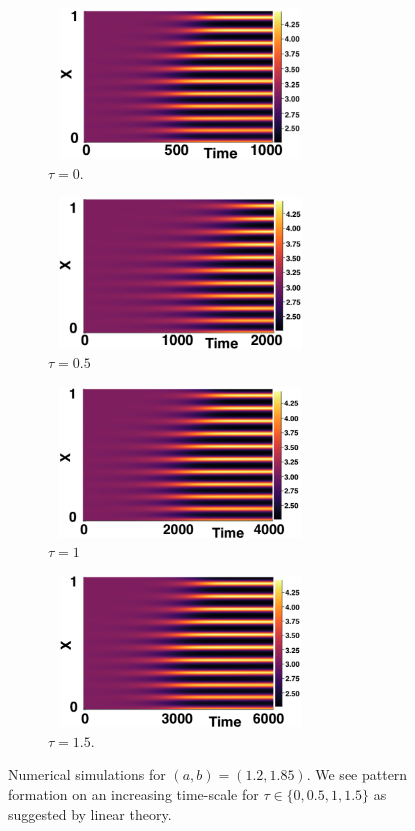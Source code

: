 \begin{figure}[H]
    \centering
    \begin{subfigure}[b]{0.45\textwidth}
        \centering
        \includegraphics[width=7cm,height=4cm]{p2t0.png}
        \caption{$\tau=0$.}
        \label{}
    \end{subfigure}
    \hfill
    \begin{subfigure}[b]{0.45\textwidth}
        \centering
        \includegraphics[width=7cm,height=4cm]{p2t05.png}
        \caption{$\tau=0.5$}
        \label{}
    \end{subfigure}
    \hfill
    \begin{subfigure}[b]{0.45\textwidth}
        \centering
        \includegraphics[width=7cm,height=4cm]{p2t1.png}
        \caption{$\tau=1$}
        \label{}
    \end{subfigure}
    \hfill
    \begin{subfigure}[b]{0.45\textwidth}
        \centering
        \includegraphics[width=7cm,height=4cm]{p2t15.png}
        \caption{$\tau=1.5$.}
        \label{}
    \end{subfigure}
    \caption{Numerical simulations for $(a,b)=(1.2,1.85)$. We see pattern formation on an increasing time-scale for $\tau\in\{0,0.5,1,1.5\}$ as suggested by linear theory.}
    \label{fig:testturing3}
\end{figure}

